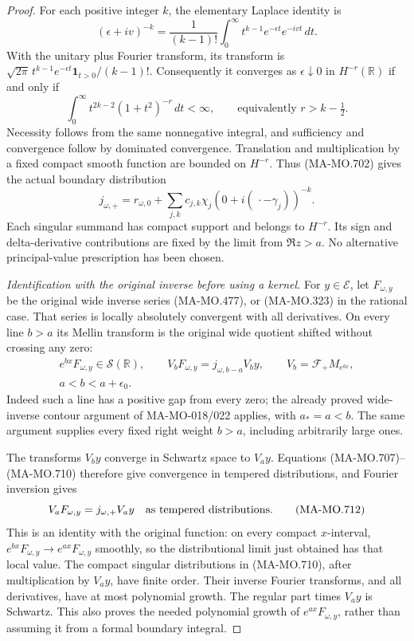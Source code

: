 \begin{proof}
For each positive integer \(k\), the elementary Laplace
identity is
\[
 (\epsilon+iv)^{-k}
     =\frac1{(k-1)!}\int_0^\infty
                 t^{k-1}e^{-\epsilon t}e^{-ivt}\,dt .
 \tag{MA-MO.708}
\]
With the unitary plus Fourier transform, its transform
is \(\sqrt{2\pi}\,t^{k-1}e^{-\epsilon t}
\mathbf1_{t>0}/(k-1)!\). Consequently it converges as
\(\epsilon\downarrow0\) in \(H^{-r}(\mathbb R)\) if
and only if
\[
       \int_0^\infty t^{2k-2}(1+t^2)^{-r}\,dt<\infty,
               \qquad\text{equivalently }r>k-\tfrac12 .
 \tag{MA-MO.709}
\]
Necessity follows from the same nonnegative integral,
and sufficiency and convergence follow by dominated
convergence. Translation and multiplication by a fixed
compact smooth function are bounded on \(H^{-r}\).
Thus (MA-MO.702) gives the actual boundary distribution
\[
 j_{\omega,+}
    =r_{\omega,0}+
       \sum_{j,k}c_{j,k}\chi_j
             (0+i(\,\cdot-\gamma_j))^{-k}.
 \tag{MA-MO.710}
\]
Each singular summand has compact support and belongs to
\(H^{-r}\). Its sign and delta-derivative contributions
are fixed by the limit from \(\Re z>a\). No alternative
principal-value prescription has been chosen.

\emph{Identification with the original inverse before using a kernel.}
For \(y\in\mathcal E\), let \(F_{\omega,y}\) be the
original wide inverse series (MA-MO.477), or (MA-MO.323)
in the rational case. That series is locally absolutely
convergent with all derivatives. On every line \(b>a\)
its Mellin transform is the original wide quotient shifted
without crossing any zero:
\[
 \begin{gathered}
 e^{bx}F_{\omega,y}\in\mathscr S(\mathbb R),\qquad
 V_bF_{\omega,y}=j_{\omega,b-a}V_by,\qquad
 V_b=\mathcal F_+M_{e^{bx}},\\
                         a<b<a+\epsilon_0 .
 \end{gathered}
 \tag{MA-MO.711}
\]
Indeed such a line has a positive gap from every zero;
the already proved wide-inverse contour argument of
MA-MO-018/022 applies, with \(a_*=a<b\).
The same argument supplies every fixed right weight
\(b>a\), including arbitrarily large ones.

The transforms \(V_by\) converge in Schwartz space to
\(V_ay\). Equations (MA-MO.707)--(MA-MO.710) therefore
give convergence in tempered distributions, and
Fourier inversion gives
\[
        V_aF_{\omega,y}=j_{\omega,+}V_ay
                    \quad\hbox{as tempered distributions}.
 \tag{MA-MO.712}
\]
This is an identity with the original function: on every
compact \(x\)-interval,
\(e^{bx}F_{\omega,y}\to e^{ax}F_{\omega,y}\) smoothly,
so the distributional limit just obtained has that
local value. The compact singular distributions in
(MA-MO.710), after multiplication by \(V_ay\), have
finite order. Their inverse Fourier transforms, and
all derivatives, have at most polynomial growth.
The regular part times \(V_ay\) is Schwartz. This
also proves the needed polynomial growth of
\(e^{ax}F_{\omega,y}\), rather than assuming it
from a formal boundary integral.


\end{proof}
